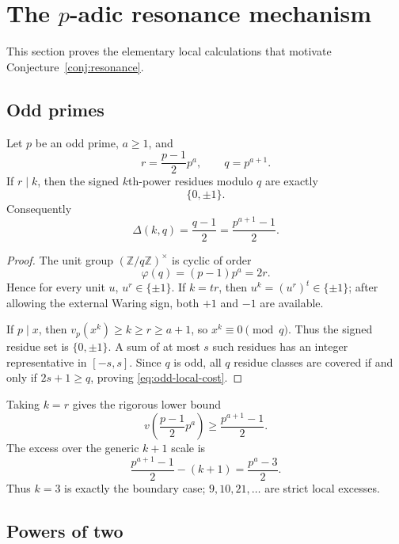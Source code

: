 \documentclass[../Axiomathic.tex]{subfiles}
\newcommand{\Z}{\mathbb Z}
\begin{document}
\section{The $p$-adic resonance mechanism}\label{sec:resonance}

This section proves the elementary local calculations that motivate Conjecture~\ref{conj:resonance}.

\subsection{Odd primes}

\begin{prop}\label{prop:odd-resonance}
Let $p$ be an odd prime, $a\ge1$, and
\[
  r=\frac{p-1}{2}p^a,
  \qquad q=p^{a+1}.
\]
If $r\mid k$, then the signed $k$th-power residues modulo $q$ are exactly
\[
  \{0,\pm1\}.
\]
Consequently
\begin{equation}\label{eq:odd-local-cost}
  \Delta(k,q)=\frac{q-1}{2}=\frac{p^{a+1}-1}{2}.
\end{equation}
\end{prop}

\begin{proof}
The unit group $(\Z/q\Z)^\times$ is cyclic of order \cite[Ch.~6]{HardyWright2008}
\[
  \varphi(q)=(p-1)p^a=2r.
\]
Hence for every unit $u$, $u^r\in\{\pm1\}$.  If $k=tr$, then $u^k=(u^r)^t\in\{\pm1\}$; after allowing the external Waring sign, both $+1$ and $-1$ are available.

If $p\mid x$, then $v_p(x^k)\ge k\ge r\ge a+1$, so $x^k\equiv0\pmod q$.  Thus the signed residue set is $\{0,\pm1\}$.  A sum of at most $s$ such residues has an integer representative in $[-s,s]$.  Since $q$ is odd, all $q$ residue classes are covered if and only if $2s+1\ge q$, proving \eqref{eq:odd-local-cost}.
\end{proof}

Taking $k=r$ gives the rigorous lower bound
\begin{equation}\label{eq:odd-lower}
  v\!\left(\frac{p-1}{2}p^a\right)
  \ge \frac{p^{a+1}-1}{2}.
\end{equation}
The excess over the generic $k+1$ scale is
\begin{equation}\label{eq:odd-excess}
  \frac{p^{a+1}-1}{2}-(k+1)=\frac{p^a-3}{2}.
\end{equation}
Thus $k=3$ is exactly the boundary case; $9,10,21,\ldots$ are strict local excesses.

\subsection{Powers of two}
\end{document}
